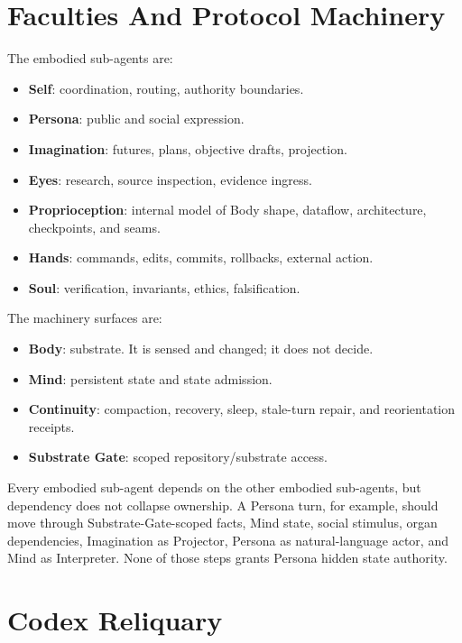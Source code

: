\documentclass[11pt]{article}
\newcommand{\bodyterm}[1]{\textbf{#1}}
\begin{document}
\section{Faculties And Protocol Machinery}

The embodied sub-agents are:

\begin{itemize}
  \item \bodyterm{Self}: coordination, routing, authority boundaries.
  \item \bodyterm{Persona}: public and social expression.
  \item \bodyterm{Imagination}: futures, plans, objective drafts, projection.
  \item \bodyterm{Eyes}: research, source inspection, evidence ingress.
  \item \bodyterm{Proprioception}: internal model of Body shape, dataflow,
  architecture, checkpoints, and seams.
  \item \bodyterm{Hands}: commands, edits, commits, rollbacks, external action.
  \item \bodyterm{Soul}: verification, invariants, ethics, falsification.
\end{itemize}

The machinery surfaces are:

\begin{itemize}
  \item \bodyterm{Body}: substrate. It is sensed and changed; it does not decide.
  \item \bodyterm{Mind}: persistent state and state admission.
  \item \bodyterm{Continuity}: compaction, recovery, sleep, stale-turn repair,
  and reorientation receipts.
  \item \bodyterm{Substrate Gate}: scoped repository/substrate access.
\end{itemize}

Every embodied sub-agent depends on the other embodied sub-agents, but
dependency does not collapse ownership. A Persona turn, for example, should
move through Substrate-Gate-scoped facts, Mind state, social stimulus, organ
dependencies, Imagination as Projector, Persona as natural-language actor, and
Mind as Interpreter. None of those steps grants Persona hidden state authority.

\section{Codex Reliquary}
\end{document}
